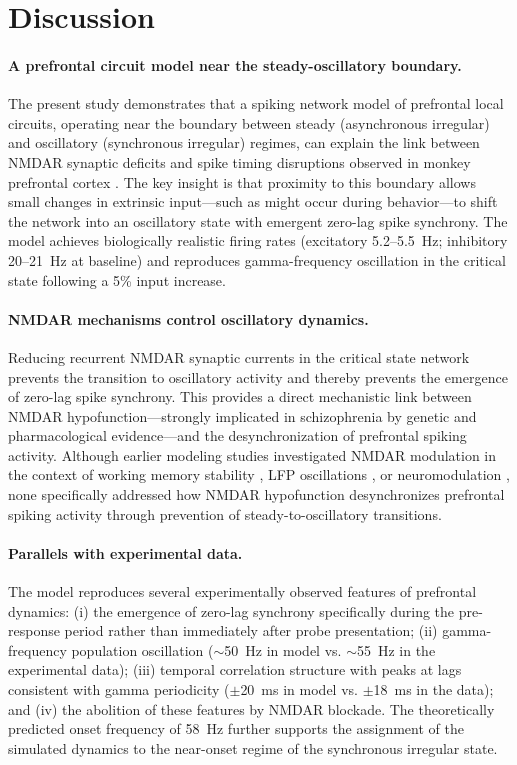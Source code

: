 \documentclass[10pt]{article}
\begin{document}
\section{Discussion}

\paragraph{A prefrontal circuit model near the steady-oscillatory boundary.}
The present study demonstrates that a spiking network model of prefrontal
local circuits, operating near the boundary between steady (asynchronous
irregular) and oscillatory (synchronous irregular) regimes, can explain the
link between NMDAR synaptic deficits and spike timing disruptions observed in
monkey prefrontal cortex \citep{zick2018blocking}. The key insight is that
proximity to this boundary allows small changes in extrinsic input---such as
might occur during behavior---to shift the network into an oscillatory state
with emergent zero-lag spike synchrony. The model achieves biologically
realistic firing rates (excitatory 5.2--5.5~Hz; inhibitory 20--21~Hz at
baseline) and reproduces gamma-frequency oscillation in the critical state
following a 5\% input increase.

\paragraph{NMDAR mechanisms control oscillatory dynamics.}
Reducing recurrent NMDAR synaptic currents in the critical state network
prevents the transition to oscillatory activity and thereby prevents the
emergence of zero-lag spike synchrony. This provides a direct mechanistic
link between NMDAR hypofunction---strongly implicated in schizophrenia by
genetic and pharmacological evidence---and the desynchronization of
prefrontal spiking activity. Although earlier modeling studies investigated
NMDAR modulation in the context of working memory stability
\citep{wang1999synaptic, compte2000synaptic}, LFP oscillations
\citep{brunel2003fast}, or neuromodulation \citep{brunel2001effects}, none
specifically addressed how NMDAR hypofunction desynchronizes prefrontal
spiking activity through prevention of steady-to-oscillatory transitions.

\paragraph{Parallels with experimental data.}
The model reproduces several experimentally observed features of prefrontal
dynamics: (i) the emergence of zero-lag synchrony specifically during the
pre-response period rather than immediately after probe presentation;
(ii) gamma-frequency population oscillation ($\sim$50~Hz in model vs.
$\sim$55~Hz in the experimental data); (iii) temporal correlation structure
with peaks at lags consistent with gamma periodicity ($\pm$20~ms in model
vs. $\pm$18~ms in the data); and (iv) the abolition of these features by
NMDAR blockade. The theoretically predicted onset frequency of 58~Hz further
supports the assignment of the simulated dynamics to the near-onset regime
of the synchronous irregular state.
\end{document}
